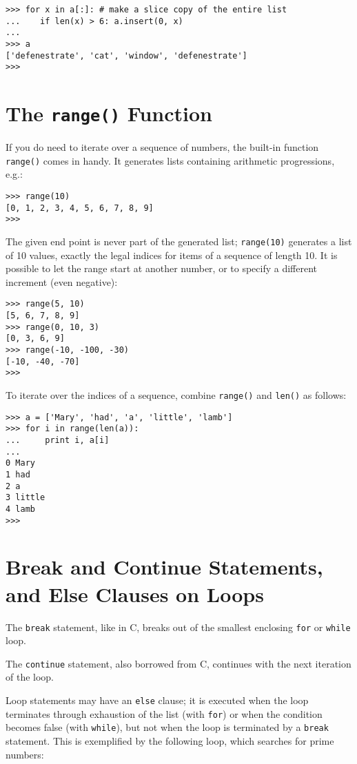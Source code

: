 \bcode\begin{verbatim}
>>> for x in a[:]: # make a slice copy of the entire list
...    if len(x) > 6: a.insert(0, x)
... 
>>> a
['defenestrate', 'cat', 'window', 'defenestrate']
>>> 
\end{verbatim}\ecode

\section{The {\tt range()} Function}

If you do need to iterate over a sequence of numbers, the built-in
function {\tt range()} comes in handy.  It generates lists containing
arithmetic progressions, e.g.:

\bcode\begin{verbatim}
>>> range(10)
[0, 1, 2, 3, 4, 5, 6, 7, 8, 9]
>>> 
\end{verbatim}\ecode
%
The given end point is never part of the generated list; {\tt range(10)}
generates a list of 10 values, exactly the legal indices for items of a
sequence of length 10.  It is possible to let the range start at another
number, or to specify a different increment (even negative):

\bcode\begin{verbatim}
>>> range(5, 10)
[5, 6, 7, 8, 9]
>>> range(0, 10, 3)
[0, 3, 6, 9]
>>> range(-10, -100, -30)
[-10, -40, -70]
>>> 
\end{verbatim}\ecode
%
To iterate over the indices of a sequence, combine {\tt range()} and
{\tt len()} as follows:

\bcode\begin{verbatim}
>>> a = ['Mary', 'had', 'a', 'little', 'lamb']
>>> for i in range(len(a)):
...     print i, a[i]
... 
0 Mary
1 had
2 a
3 little
4 lamb
>>> 
\end{verbatim}\ecode

\section{Break and Continue Statements, and Else Clauses on Loops}

The {\tt break} statement, like in C, breaks out of the smallest
enclosing {\tt for} or {\tt while} loop.

The {\tt continue} statement, also borrowed from C, continues with the
next iteration of the loop.

Loop statements may have an {\tt else} clause; it is executed when the
loop terminates through exhaustion of the list (with {\tt for}) or when
the condition becomes false (with {\tt while}), but not when the loop is
terminated by a {\tt break} statement.  This is exemplified by the
following loop, which searches for prime numbers:

